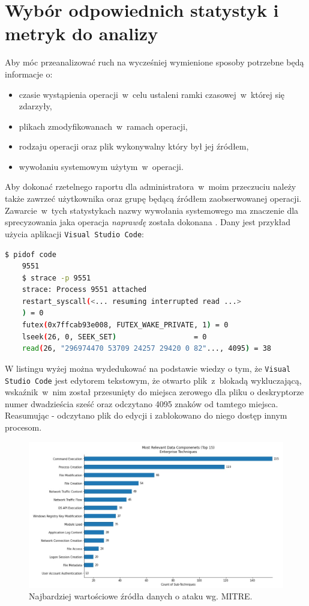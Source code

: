 \section{Wybór odpowiednich statystyk i metryk do analizy}
\label{sec:wybor}
Aby móc przeanalizować ruch na wycześniej wymienione sposoby potrzebne będą informacje o:
\begin{itemize}
    \item czasie wystąpienia operacji~w~celu ustaleni ramki czasowej~w~której się zdarzyły,
    \item plikach zmodyfikowanach~w~ramach operacji,
    \item rodzaju operacji oraz plik wykonywalny który był jej źródłem,
    \item wywołaniu systemowym użytym~w~operacji.
\end{itemize}
Aby dokonać rzetelnego raportu dla administratora~w~moim przeczuciu należy także zawrzeć użytkownika oraz grupę będącą źródłem zaobserwowanej operacji. 
Zawarcie~w~tych statystykach nazwy wywołania systemowego ma znaczenie dla sprecyzowania jaka operacja \emph{naprawdę} została dokonana \cite{kernel}. Dany jest przykład użycia aplikacji \texttt{Visual Studio Code}: 
\begin{lstlisting}[language=bash,
    backgroundcolor=\color{EEGold!5!white},
    caption={Przykładowo używając \texttt{Visual Studio Code} niektóre operacje mogą
    sprawiać pozory, że na pliku wywołano polecenie \texttt{code} bez wiedzy co dokładnie zaszło podczas działania programu.},
    label={lst:helloC}]
    $ pidof code
    9551
    $ strace -p 9551
    strace: Process 9551 attached
    restart_syscall(<... resuming interrupted read ...>
    ) = 0
    futex(0x7ffcab93e008, FUTEX_WAKE_PRIVATE, 1) = 0
    lseek(26, 0, SEEK_SET)                  = 0
    read(26, "296974470 53709 24257 29420 0 82"..., 4095) = 38
\end{lstlisting}
W listingu wyżej można wydedukować na podstawie wiedzy o tym, że \texttt{Visual Studio Code} jest edytorem tekstowym, że otwarto plik~z~blokadą wykluczającą, wskaźnik~w~nim został przesunięty do miejsca zerowego dla pliku o deskryptorze numer dwadzieścia sześć oraz odczytano 4095 znaków od tamtego miejsca. Reasumując - odczytano plik do edycji i zablokowano do niego dostęp innym procesom.
\begin{figure}[H]
    \centering
    \includegraphics[width=0.75\linewidth]{rysunki/relevant_data_components.jpg}
    \caption{Najbardziej wartościowe źródła danych o ataku wg. MITRE\protect\footnotemark .}
    \label{fig:enter-label}
\end{figure}
